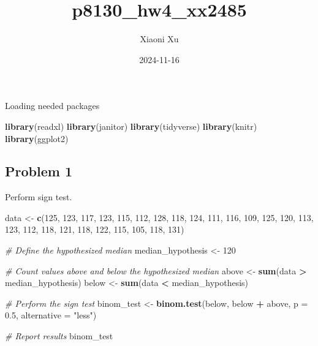 \documentclass[
]{article}
\title{p8130\_hw4\_xx2485}
\author{Xiaoni Xu}
\date{2024-11-16}
\newenvironment{Shaded}{\begin{snugshade}}{\end{snugshade}}
\newcommand{\AttributeTok}[1]{\textcolor[rgb]{0.13,0.29,0.53}{#1}}
\newcommand{\CommentTok}[1]{\textcolor[rgb]{0.56,0.35,0.01}{\textit{#1}}}
\newcommand{\DecValTok}[1]{\textcolor[rgb]{0.00,0.00,0.81}{#1}}
\newcommand{\FloatTok}[1]{\textcolor[rgb]{0.00,0.00,0.81}{#1}}
\newcommand{\FunctionTok}[1]{\textcolor[rgb]{0.13,0.29,0.53}{\textbf{#1}}}
\newcommand{\NormalTok}[1]{#1}
\newcommand{\OtherTok}[1]{\textcolor[rgb]{0.56,0.35,0.01}{#1}}
\newcommand{\SpecialCharTok}[1]{\textcolor[rgb]{0.81,0.36,0.00}{\textbf{#1}}}
\newcommand{\StringTok}[1]{\textcolor[rgb]{0.31,0.60,0.02}{#1}}
\begin{document}
\maketitle

Loading needed packages

\begin{Shaded}
\begin{Highlighting}[]
\FunctionTok{library}\NormalTok{(readxl)}
\FunctionTok{library}\NormalTok{(janitor)}
\FunctionTok{library}\NormalTok{(tidyverse)}
\FunctionTok{library}\NormalTok{(knitr)}
\FunctionTok{library}\NormalTok{(ggplot2)}
\end{Highlighting}
\end{Shaded}

\subsection{Problem 1}\label{problem-1}

Perform sign test.

\begin{Shaded}
\begin{Highlighting}[]
\NormalTok{data }\OtherTok{\textless{}{-}} \FunctionTok{c}\NormalTok{(}\DecValTok{125}\NormalTok{, }\DecValTok{123}\NormalTok{, }\DecValTok{117}\NormalTok{, }\DecValTok{123}\NormalTok{, }\DecValTok{115}\NormalTok{, }\DecValTok{112}\NormalTok{, }\DecValTok{128}\NormalTok{, }\DecValTok{118}\NormalTok{, }\DecValTok{124}\NormalTok{, }\DecValTok{111}\NormalTok{, }\DecValTok{116}\NormalTok{, }\DecValTok{109}\NormalTok{, }
          \DecValTok{125}\NormalTok{, }\DecValTok{120}\NormalTok{, }\DecValTok{113}\NormalTok{, }\DecValTok{123}\NormalTok{, }\DecValTok{112}\NormalTok{, }\DecValTok{118}\NormalTok{, }\DecValTok{121}\NormalTok{, }\DecValTok{118}\NormalTok{, }\DecValTok{122}\NormalTok{, }\DecValTok{115}\NormalTok{, }\DecValTok{105}\NormalTok{, }\DecValTok{118}\NormalTok{, }\DecValTok{131}\NormalTok{)}

\CommentTok{\# Define the hypothesized median}
\NormalTok{median\_hypothesis }\OtherTok{\textless{}{-}} \DecValTok{120}

\CommentTok{\# Count values above and below the hypothesized median}
\NormalTok{above }\OtherTok{\textless{}{-}} \FunctionTok{sum}\NormalTok{(data }\SpecialCharTok{\textgreater{}}\NormalTok{ median\_hypothesis)}
\NormalTok{below }\OtherTok{\textless{}{-}} \FunctionTok{sum}\NormalTok{(data }\SpecialCharTok{\textless{}}\NormalTok{ median\_hypothesis)}

\CommentTok{\# Perform the sign test}
\NormalTok{binom\_test }\OtherTok{\textless{}{-}} \FunctionTok{binom.test}\NormalTok{(below, below }\SpecialCharTok{+}\NormalTok{ above, }\AttributeTok{p =} \FloatTok{0.5}\NormalTok{, }\AttributeTok{alternative =} \StringTok{"less"}\NormalTok{)}

\CommentTok{\# Report results}
\NormalTok{binom\_test}
\end{Highlighting}
\end{Shaded}
\end{document}
